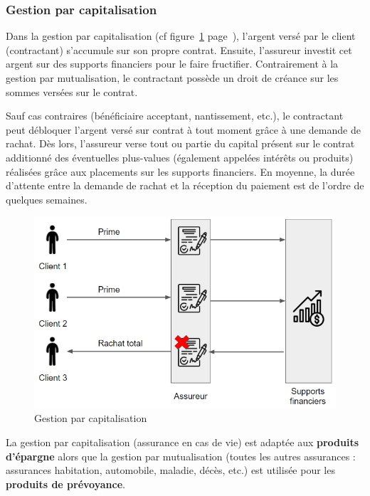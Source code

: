 \documentclass{article}
\newcommand{\blackFrame}[2]{
    \begin{tcolorbox}[colback=white,colframe=black!100!white,title={#1}]
        #2
    \end{tcolorbox}
}
\begin{document}
\subsubsection{Gestion par capitalisation}
Dans la gestion par capitalisation (cf figure~\ref{gestion_capitalisation} page~\pageref{gestion_capitalisation}), l'argent versé par le client (contractant) s'accumule sur son propre contrat. Ensuite, l'assureur investit cet argent sur des supports financiers pour le faire fructifier. Contrairement à la gestion par mutualisation, le contractant possède un droit de créance sur les sommes versées sur le contrat.

Sauf cas contraires (bénéficiaire acceptant, nantissement, etc.), le contractant peut débloquer l'argent versé sur contrat à tout moment grâce à une demande de rachat. Dès lors, l'assureur verse tout ou partie du capital présent sur le contrat additionné des éventuelles plus-values (également appelées intérêts ou produits) réalisées grâce aux placements sur les supports financiers. En moyenne, la durée d'attente entre la demande de rachat et la réception du paiement est de l'ordre de quelques semaines.

\begin{figure}[h!]
    \includegraphics[width=\textwidth]{resources/gestion_capitalisation.PNG}
    \caption{\label{gestion_capitalisation} Gestion par capitalisation
    }
\end{figure}

\blackFrame{Résumé}{
La gestion par capitalisation (assurance en cas de vie) est adaptée aux \textbf{produits d'épargne} alors que la gestion par mutualisation (toutes les autres assurances : assurances habitation, automobile, maladie, décès, etc.) est utilisée pour les \textbf{produits de prévoyance}.
}
\end{document}
